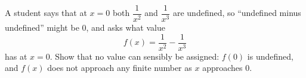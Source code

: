 A student says that at $x=0$ both $\dfrac{1}{x^2}$ and $\dfrac{1}{x^3}$ are undefined, so ``undefined minus undefined'' might be $0$, and asks what value
\[
f(x)=\dfrac{1}{x^2}-\dfrac{1}{x^3}
\]
has at $x=0$. Show that no value can sensibly be assigned: $f(0)$ is undefined, and $f(x)$ does not approach any finite number as $x$ approaches $0$.
